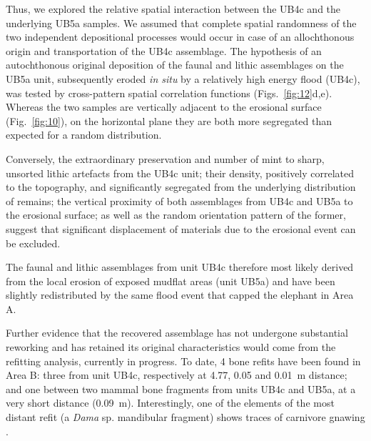 \documentclass[preprint,authoryear,times]{elsarticle} %
\begin{document}
Thus, we explored the relative spatial interaction between the UB4c and the underlying UB5a samples. We assumed that complete spatial randomness of the two independent depositional processes would occur in case of an allochthonous origin and transportation of the UB4c assemblage. The hypothesis of an autochthonous original deposition of the faunal and lithic assemblages on the UB5a unit, subsequently eroded \emph{in situ} by a relatively high energy flood (UB4c), was tested by cross-pattern spatial correlation functions (Figs.~\ref{fig:12}d,e). Whereas the two samples are vertically adjacent to the erosional surface (Fig.~\ref{fig:10}), on the horizontal plane they are both more segregated than expected for a random distribution.


Conversely, the extraordinary preservation and number of mint to sharp, unsorted lithic artefacts from the UB4c unit; their density, positively correlated to the topography, and significantly segregated from the underlying distribution of remains; the vertical proximity of both assemblages from UB4c and UB5a to the erosional surface; as well as the random orientation pattern of the former, suggest that significant displacement of materials due to the erosional event can be excluded.

The faunal and lithic assemblages from unit UB4c therefore most likely derived from the local erosion of exposed mudflat areas (unit UB5a) and have been slightly redistributed by the same flood event that capped the elephant in Area A.

Further evidence that the recovered assemblage has not undergone substantial reworking and has retained its original characteristics would come from the refitting analysis, currently in progress. To date, 4 bone refits have been found in Area B: three from unit UB4c, respectively at 4.77, 0.05 and 0.01~m distance; and one between two mammal bone fragments from units UB4c and UB5a, at a very short distance (0.09~m). Interestingly, one of the elements of the most distant refit (a \emph{Dama} sp. mandibular fragment) shows traces of carnivore gnawing \citep{Konidaris}.
\end{document}
